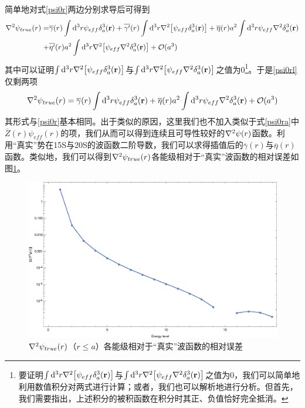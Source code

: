 \documentclass[cs4size,titlepage,twoside]{ctexart}
\begin{document}
简单地对式\eqref{psi0r}两边分别求导后可得到
\begin{alignat}{1}\label{psi0rl}
	\laplacian{\psi_{true}(r)}= & \overline{\gamma}(r)\int\dd^3r\psi_{eff}\delta^3_a(\vb{r})+\overline{\gamma'}(r)\int\dd^3r\laplacian{\bqty{\psi_{eff}\delta^3_a(\vb{r})}}+\overline{\eta}(r)a^2\int\dd^3r\psi_{eff}\laplacian{\delta^3_a(\vb{r})}
	\nonumber\\+&\overline{\eta'}(r)a^2\int\dd^3r\laplacian{\bqty{\psi_{eff}\laplacian{\delta^3_a(\vb{r})}}}+\mathcal{O}(a^3)
\end{alignat}
其中可以证明$\int\dd^3r\laplacian{\bqty{\psi_{eff}\delta^3_a(\vb{r})}}$与$\int\dd^3r\laplacian{\bqty{\psi_{eff}\laplacian{\delta^3_a(\vb{r})}}}$之值为0\footnote{要证明$\int\dd^3r\laplacian{\bqty{\psi_{eff}\delta^3_a(\vb{r})}}$与$\int\dd^3r\laplacian{\bqty{\psi_{eff}\laplacian{\delta^3_a(\vb{r})}}}$之值为0，我们可以简单地利用数值积分对两式进行计算；或者，我们也可以解析地进行分析。但首先，我们需要指出，上述积分的被积函数在积分时其正、负值恰好完全抵消。}。于是\eqref{psi0rl}仅剩两项
\begin{equation}\label{psi0rl2}
	\laplacian{\psi_{true}(r)}=\overline{\gamma}(r)\int\dd^3r\psi_{eff}\delta^3_a(\vb{r})+\overline{\eta}(r)a^2\int\dd^3r\psi_{eff}\laplacian{\delta^3_a(\vb{r})}+\mathcal{O}(a^3)
\end{equation}
其形式与\eqref{psi0r}基本相同。出于类似的原因，这里我们也不加入类似于式\eqref{psi0ra}中$\overline{Z}(r)\psi_{eff}(r)$的项，我们从而可以得到连续且可导性较好的$\laplacian{\psi(r)}$函数。利用“真实”势在15S与20S的波函数二阶导数，我们可以求得插值后的$\overline{\gamma}(r)$与$\overline{\eta}(r)$函数。类似地，我们可以得到$\laplacian{\psi_{true}(r)}$各能级相对于“真实”波函数的相对误差如图\ref{psirlap}。
\begin{figure}[H]
	\centering
	\includegraphics[width=6in]{psirlap1.eps}
	\caption{$\laplacian{\psi_{true}(r)}$（$r\leq a$）各能级相对于“真实”波函数的相对误差}\label{psirlap}
\end{figure}
\end{document}
